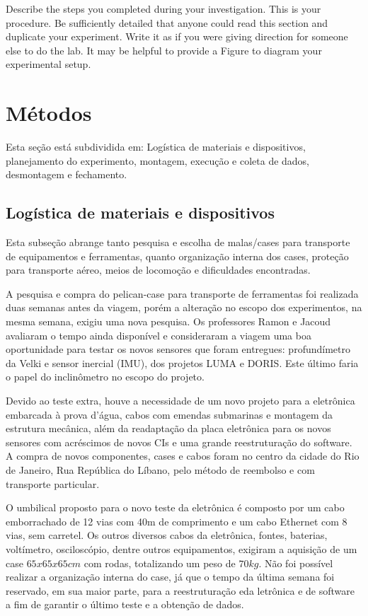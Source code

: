 
Describe the steps you completed during your investigation. This is your procedure. Be sufficiently detailed that anyone could read this section and duplicate your experiment. Write it as if you were giving direction for someone else to do the lab. It may be helpful to provide a Figure to diagram your experimental setup.


\section{Métodos}
Esta seção está subdividida em: Logística de materiais e dispositivos,
planejamento do experimento, montagem, execução e coleta de dados,
desmontagem e fechamento.

\subsection{Logística de materiais e dispositivos}
Esta subseção abrange tanto pesquisa e escolha de malas/cases para
transporte de equipamentos e ferramentas, quanto organização interna dos
cases, proteção para transporte aéreo, meios de locomoção e dificuldades
encontradas.

A pesquisa e compra do pelican-case para transporte de ferramentas foi
realizada duas semanas antes da viagem, porém a alteração no escopo dos experimentos, na mesma
semana, exigiu uma nova pesquisa. Os professores Ramon e Jacoud avaliaram o
tempo ainda disponível e consideraram a viagem uma boa oportunidade para testar
os novos sensores que foram entregues:
profundímetro da Velki e sensor inercial (IMU), dos projetos LUMA e DORIS. Este
último faria o papel do inclinômetro no escopo do projeto. 

Devido ao teste extra, houve a necessidade de um novo projeto para a eletrônica
embarcada à prova d'água, cabos com emendas submarinas e montagem da estrutura mecânica, além da readaptação da placa eletrônica para os novos sensores com acréscimos de novos
CIs e uma grande reestruturação do software. A compra de novos componentes,
cases e cabos foram no centro da cidade do Rio de Janeiro, Rua República do
Líbano, pelo método de reembolso e com transporte particular.

O umbilical proposto para o novo teste da eletrônica é composto por um cabo
emborrachado de 12 vias com 40m de comprimento e um cabo Ethernet com 8 vias,
sem carretel.
Os outros diversos cabos da eletrônica, fontes, baterias, voltímetro,
osciloscópio, dentre outros equipamentos, exigiram a aquisição de um case
$65x65x65cm$ com rodas, totalizando um peso de $70kg$. Não foi possível realizar
a organização interna do case, já que o tempo da última semana foi reservado, em
sua maior parte, para a reestruturação eda letrônica e de software a fim de
garantir o último teste e a obtenção de dados.

